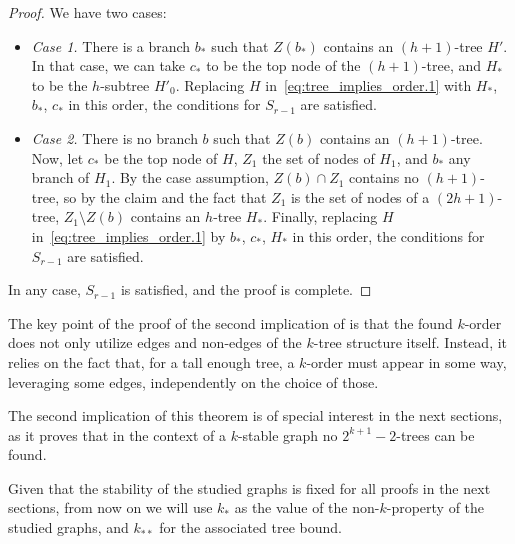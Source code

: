 \begin{theorem}
\begin{proof}
            We have two cases:
            \begin{itemize}
                \item \emph{Case 1.} There is a branch $b_*$ such that $Z(b_*)$ contains an $(h+1)$-tree $H'$.
                    In that case, we can take $c_*$ to be the top node of the $(h+1)$-tree, and $H_*$ to be the
                    $h$-subtree $H'_0$.
                    Replacing $H$ in~\eqref{eq:tree_implies_order.1} with $H_*$, $b_*$, $c_*$ in this order, the
                    conditions for $S_{r-1}$ are satisfied.
                \item \emph{Case 2.} There is no branch $b$ such that $Z(b)$ contains an $(h+1)$-tree.
                    Now, let $c_*$ be the top node of $H$, $Z_1$ the set of nodes of $H_1$, and
                    $b_*$ any branch of $H_1$.
                    By the case assumption, $Z(b) \cap Z_1$ contains no $(h+1)$-tree, so by the claim
                    and the fact that $Z_1$ is the set of nodes of a $(2h+1)$-tree,
                    $Z_1 \setminus Z(b)$ contains an $h$-tree $H_*$.
                    Finally, replacing $H$ in~\eqref{eq:tree_implies_order.1} by $b_*$, $c_*$, $H_*$ in this order, the
                    conditions for $S_{r-1}$ are satisfied.
            \end{itemize}
            In any case, $S_{r-1}$ is satisfied, and the proof is complete.
        \end{proof}
    \end{theorem}

    \begin{remark}
        The key point of the proof of the second implication of  is that the found $k$-order
        does not only utilize edges and non-edges of the $k$-tree structure itself.
        Instead, it relies on the fact that, for a tall enough tree, a $k$-order must appear in some way, leveraging
        some  edges, independently on the choice of those.
    \end{remark}

    The second implication of this theorem is of special interest in the next sections, as it proves that in the context
    of a $k$-stable graph no $2^{k+1}-2$-trees can be found.

    Given that the stability of the studied graphs is fixed for all proofs in the next sections, from now on we will use
    $k_*$ as the value of the non-$k$-property of the studied graphs, and $k_{**}$ for the associated tree bound.